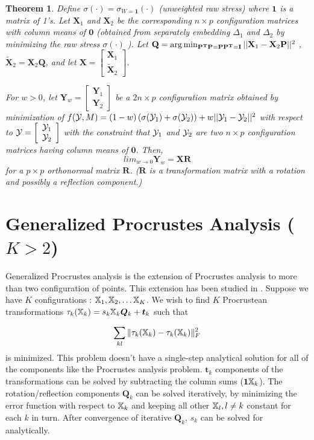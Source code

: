 \documentclass[12pt,oneside,final]{thesis}\usepackage[]{graphicx}\usepackage[]{color}
\newtheorem{thm}{Theorem}
\begin{document}
\begin{thm}
Define $\sigma(\cdot)=\sigma_{W=\bm{1}}(\cdot)$ (unweighted raw stress) where $\bm{1}$ is a matrix of 1's.
 Let $\mathbf{X}_1$ and $\mathbf{X}_2$ be the corresponding $n\times p$ configuration matrices with column means of $\bm{0}$ (obtained from separately embedding  $\Delta_1$ and $\Delta_2$ by minimizing the raw stress $\sigma(\cdot)$ ). 
Let  $\mathbf{Q}=\arg\min_{\mathbf{P^T}\mathbf{P}=\mathbf{P}\mathbf{P^T}=\mathbf{I}}||{\mathbf{X}_1-\mathbf{X}_2}\mathbf{P}||^2$ ,   $\mathbf{\tilde{X}}_2= \mathbf{X}_2\mathbf{Q}$, 
and let  
$\mathbf{X}=\left[\begin{array}{c}
\mathbf{X}_1\\
\mathbf{\tilde{X}}_2
\end{array}\right]$.

For $w>0$, let $\mathbf{Y}_{w} = \left[\begin{array}{c}
\mathbf{Y}_1\\
\mathbf{Y}_2
\end{array}\right]$  be  a $2n \times p$ configuration matrix obtained by minimization of 
$ f(\mathcal{Y}, M) =(1-w)\left({\sigma{(\mathcal{Y}_1)}}+{\sigma{(\mathcal{Y}_2)}}\right)+w||{\mathcal{Y}_1-\mathcal{Y}_2}||^2 $ with respect to  $\mathcal{Y}=\left[\begin{array}{c}
\mathcal{Y}_1\\
\mathcal{Y}_2
\end{array}\right]$ with the constraint that $\mathcal{Y}_1$ and $\mathcal{Y}_2$ are two $n \times p$ configuration matrices having column means of $\bm{0}$. Then, $$lim_{w\rightarrow0}\mathbf{Y}_{w}=\mathbf{X}\mathbf{R}$$ for a $p\times p$ orthonormal matrix $\mathbf{R}$. ($\mathbf{R}$ is a transformation matrix with a rotation and possibly a reflection component.)
\end{thm}
 
\section{Generalized Procrustes Analysis ($K>2$) \label{sec:GenProcrustes}}
Generalized Procrustes analysis is the extension of Procrustes analysis to more than two configuration of points. This extension has been studied in \cite{GPCA}. Suppose we have $K$ configurations : $\mathbb{X}_1,\mathbb{X}_2,\ldots \mathbb{X}_K$. We wish to find $K$ Procrustean transformations  $\tau_k(\mathbb{X}_k)= s_k\mathbb{X}_k\bm{Q}_k+\bm{t}_{k}$ such that 

\[\sum_{kl}\|\tau_k(\mathbb{X}_k)-\tau_k(\mathbb{X}_k)\|^2_F\] is minimized. This problem doesn't have a single-step analytical solution  for all of the components like the Procrustes analysis problem. $\bm{t}_{k}$ components of the transformations can be solved by subtracting the column sums  ($\mbox{{\bf 1}}\mathbb{X}_k$). The rotation/reflection components $\bm{Q}_k$ can be solved iteratively, by minimizing the error function with respect to $\mathbb{X}_k$ and keeping all other $\mathbb{X}_l, l \neq k$ constant for each $k$ in turn. After convergence of iterative  $\bm{Q}_k$, $s_k$ can be solved for analytically.
\end{document}
